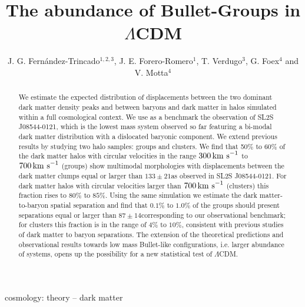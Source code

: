 \documentclass{emulateapj}
\newcommand{\hkpc}{{\ifmmode{h^{-1}{\rm kpc}}\else{$h^{-1}$kpc }\fi}}
\newcommand{\kms}{{\ifmmode{{\mathrm{\,km\ s}^{-1}}}\else{\,km~s$^{-1}$}\fi}}
\newcommand{\bullg}{SL2S J08544-0121}
\begin{document}
 

\title{The abundance of Bullet-Groups in $\Lambda$CDM}
\author{J. G. Fern\'andez-Trincado$^{1,2,3}$, J. E. Forero-Romero$^1$,
  T. Verdugo$^3$, G. Foex$^4$ and V. Motta$^4$} 

\begin{abstract}

We estimate the expected distribution of displacements between the two
dominant dark matter density peaks and between baryons and dark matter
in halos simulated within a full cosmological context. We use as a benchmark the
observation of \bullg, which is the lowest mass system observed so far
featuring a bi-modal dark matter distribution with a dislocated 
baryonic component. We extend previous results by
studying two halo samples: groups and clusters. We find that 50\% to 60\%
of the dark matter halos with circular velocities in the range
$300\kms$ to $700\kms$ (groups) show multimodal morphologies with
displacements between the dark matter clumps equal or larger than
$133\pm21$\hkpc as observed in \bullg. For dark matter halos with
circular velocities larger than $700\kms$ (clusters) this fraction
rises to $80\%$ to $85\%$. Using the same simulation we estimate the
dark matter-to-baryon spatial separation and find that $0.1\%$ to
$1.0\%$ of the groups should present separations equal or
larger than $87\pm 14$\hkpc corresponding to our observational
benchmark; for clusters this fraction is in the range of $4\%$ to
$10\%$, consistent with previous studies of dark matter to baryon
separations. The extension of the theoretical predictions and
observational results towards low mass Bullet-like configurations,
i.e. larger abundance of systems,  opens up the possibility for a new
statistical test of  $\Lambda$CDM.  
\end{abstract}

\begin{keywords}
{cosmology: theory -- dark matter} 
\end{keywords}
\end{document}
